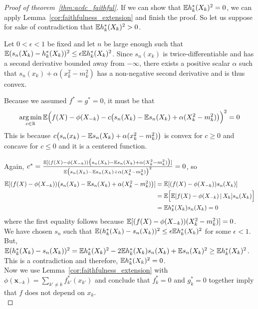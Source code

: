 \begin{proof}[Proof of theorem~\ref{thm:acdc_faithful}]
If we can show that ${\mathbb E} h^*_k(X_k)^2 = 0$, we can apply
Lemma~\ref{cor:faithfulness_extension} and finish the proof. So let us
suppose for sake of contradiction that ${\mathbb E} h^*_k(X_k)^2 > 0$.

Let $0 < \epsilon < 1$ be fixed and let $n$ be large enough such that ${\mathbb E}( s_n(X_k) - h^*_k(X_k))^2 \leq \epsilon {\mathbb E} h^*_k(X_k)^2 $.
Since $s_n(x_k)$ is twice-differentiable and has a second derivative
bounded away from $-\infty$, there exists a positive scalar $\alpha$
such that $s_n(x_k) + \alpha(x_k^2 - m_k^2)$ has a non-negative second
derivative and is thus convex.

Because we assumed $f^* = g^* = 0$, it must be that
\[
\mathop{\text{\rm arg\,min}}_{c \in {\mathbb R}} 
{\mathbb E}\Big( f(X) - \phi(X_{-k}) - c\big( s_n(X_k) - {\mathbb E} s_n(X_k) + \alpha(X_k^2 - m_k^2)\big) \Big)^2 = 0
\]
This is because $c\big( s_n(x_k) - {\mathbb E} s_n(X_k) + \alpha(x_k^2 - m_k^2) \big)$ is
convex for $c \geq 0$ and concave for $c \leq 0$ and it is a centered
function.

Again, $c^* = \frac{\mathbb{E}[(f(X)-\phi(X_{-k}))\big( 
           s_n(X_k) - {\mathbb E} s_n(X_k)  + \alpha (X_k^2 - m_k^2) \big)]}{\mathbb{E}
       \big( s_n(X_k) - {\mathbb E} s_n(X_k) + \alpha (X_k^2 - m_k^2) \big)^2} = 0$, so
\begin{align*}
\mathbb{E}[ (f(X)-\phi(X_{-k})) \big( s_n(X_k)- {\mathbb E} s_n(X_k) + \alpha (X_k^2-m_k^2) \big) ] &= 
\mathbb{E}[ (f(X) - \phi(X_{-k})) s_n(X_k) ] \\
& = \mathbb{E}\Big[ \mathbb{E}[ f(X) - \phi(X_{-k}) {\,|\,} X_k]  s_n(X_k) \Big] \\
& = \mathbb{E} h^*_k(X_k) s_n(X_k)  = 0
\end{align*}
where the first equality follows because ${\mathbb E}[ (f(X) - \phi(X_{-k})) (X_k^2 - m_k^2)] = 0$. \\

We have chosen $s_n$ such that ${\mathbb E}(h^*_k(X_k) - s_n(X_k))^2 \leq \epsilon {\mathbb E} h^*_k(X_k)^2$ for some $\epsilon < 1$. But, ${\mathbb E} (h^*_k(X_k) - s_n(X_k))^2 = {\mathbb E} h^*_k(X_k)^2 - 2 {\mathbb E} h^*_k(X_k)s_n(X_k) + {\mathbb E} s_n(X_k)^2 \geq {\mathbb E} h^*_k(X_k)^2$. This is a contradiction and therefore, ${\mathbb E} h^*_k(X_k)^2 = 0$.\\

Now we use
Lemma~\ref{cor:faithfulness_extension} with $\phi(\mathbf{x}_{-k}) =
\sum_{k' \neq k} f^*_{k'} (x_{k'})$ and conclude that
$f^*_k = 0$ and $g^*_k = 0$ together imply that $f$ does not depend on $x_k$.\\


\end{proof}
